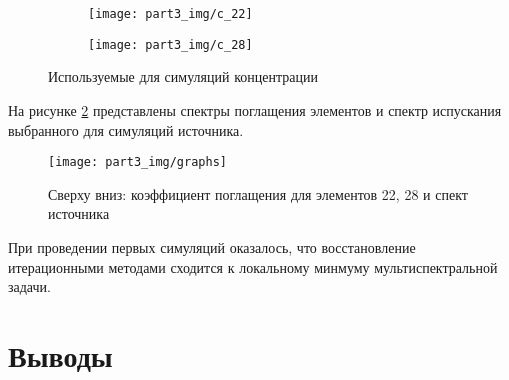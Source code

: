 \begin{figure}
\begin{subfigure}[h]{0.45\textwidth}
  \centering
    \texttt{[image: part3\_img/c\_22]}
\end{subfigure}
\begin{subfigure}[h]{0.45\textwidth}
  \centering
    \texttt{[image: part3\_img/c\_28]}
\end{subfigure}
  \caption{Используемые для симуляций концентрации}
\label{fig:white_phantom}
\end{figure}

На рисунке \ref{fig:source} представлены спектры поглащения элементов и спектр испускания выбранного для симуляций источника.

\begin{figure}
  \centering
  \texttt{[image: part3\_img/graphs]}
  \caption{Сверху вниз: коэффициент поглащения для элементов 22, 28 и спект источника}
  \label{fig:source}
\end{figure}

При проведении первых симуляций оказалось, что восстановление итерационными методами сходится к локальному минмуму мультиспектральной задачи.


\section{Выводы} \label{sect_3_3}
